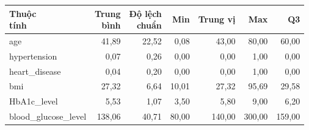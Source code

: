 \begin{tabular}{lrrrrrr}
\toprule
\makecell[l]{Thuộc\\tính} & \makecell[r]{Trung\\bình} & \makecell[r]{Độ lệch\\chuẩn} & Min & Trung vị & Max & Q3 \\
\midrule
age & 41{,}89 & 22{,}52 & 0{,}08 & 43{,}00 & 80{,}00 & 60{,}00 \\
hypertension & 0{,}07 & 0{,}26 & 0{,}00 & 0{,}00 & 1{,}00 & 0{,}00 \\
heart\_disease & 0{,}04 & 0{,}20 & 0{,}00 & 0{,}00 & 1{,}00 & 0{,}00 \\
bmi & 27{,}32 & 6{,}64 & 10{,}01 & 27{,}32 & 95{,}69 & 29{,}58 \\
HbA1c\_level & 5{,}53 & 1{,}07 & 3{,}50 & 5{,}80 & 9{,}00 & 6{,}20 \\
blood\_glucose\_level & 138{,}06 & 40{,}71 & 80{,}00 & 140{,}00 & 300{,}00 & 159{,}00 \\
\bottomrule
\end{tabular}

